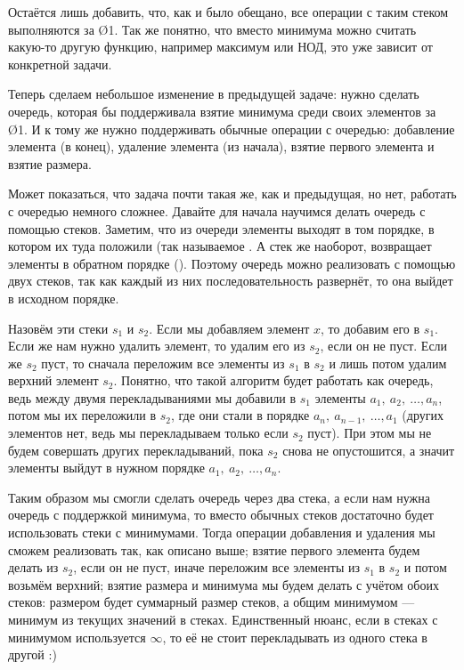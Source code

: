 
Остаётся лишь добавить, что, как и было обещано, все операции с таким стеком выполняются за \O{1}. Так же понятно, что вместо минимума можно считать какую-то другую функцию, например максимум или НОД, это уже зависит от конкретной задачи.


Теперь сделаем небольшое изменение в предыдущей задаче: нужно сделать очередь, которая бы поддерживала взятие минимума среди своих элементов за \O{1}. И к тому же нужно поддерживать обычные операции с очередью: добавление элемента (в конец), удаление элемента (из начала), взятие первого элемента и взятие размера. 

Может показаться, что задача почти такая же, как и предыдущая, но нет, работать с очередью немного сложнее. Давайте для начала научимся делать очередь с помощью стеков. Заметим, что из очереди элементы выходят в том порядке, в котором их туда положили (так называемое . А стек же наоборот, возвращает элементы в обратном порядке (). Поэтому очередь можно реализовать с помощью двух стеков, так как каждый из них последовательность развернёт, то она выйдет в исходном порядке.

Назовём эти стеки $s_1$ и $s_2$. Если мы добавляем элемент $x$, то добавим его в $s_1$. Если же нам нужно удалить элемент, то удалим его из $s_2$, если он не пуст. Если же $s_2$ пуст, то сначала переложим все элементы из $s_1$ в $s_2$ и лишь потом удалим верхний элемент $s_2$. Понятно, что такой алгоритм будет работать как очередь, ведь между двумя перекладываниями мы добавили в $s_1$ элементы $a_1,\ a_2,\ \ldots, a_n$, потом мы их переложили в $s_2$, где они стали в порядке $a_n,\ a_{n - 1},\ \ldots, a_1$ (других элементов нет, ведь мы перекладываем только если $s_2$ пуст). При этом мы не будем совершать других перекладываний, пока $s_2$ снова не опустошится, а значит элементы выйдут в нужном порядке $a_1,\ a_2,\ \ldots, a_n$.

Таким образом мы смогли сделать очередь через два стека, а если нам нужна очередь с поддержкой минимума, то вместо обычных стеков достаточно будет использовать стеки с минимумами. Тогда операции добавления и удаления мы сможем реализовать так, как описано выше; взятие первого элемента будем делать из $s_2$, если он не пуст, иначе переложим все элементы из $s_1$ в $s_2$ и потом возьмём верхний; взятие размера и минимума мы будем делать с учётом обоих стеков: размером будет суммарный размер стеков, а общим минимумом — минимум из текущих значений в стеках. Единственный нюанс, если в стеках с минимумом используется $\infty$, то её не стоит перекладывать из одного стека в другой :)

